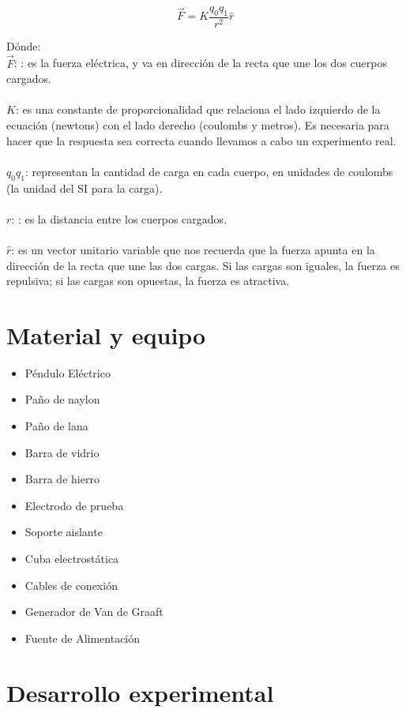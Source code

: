\documentclass[11pt]{article}
\begin{document}
\begin{multicols}{2}
$$\vec F=K \frac{q_0 q_1}{r^2}\hat r$$

Dónde:\\

$\vec F$: : es la fuerza eléctrica, y va en dirección de la recta que une los dos cuerpos cargados.\\\\
$K$: es una constante de proporcionalidad que relaciona el lado izquierdo de la ecuación (newtons) con el lado derecho (coulombs y metros). Es necesaria para hacer que la respuesta sea correcta cuando llevamos a cabo un experimento real.\\\\
$q_0 q_1$: representan la cantidad de carga en cada cuerpo, en unidades de coulombs (la unidad del SI para la carga).\\\\
$r$: : es la distancia entre los cuerpos cargados.\\\\
$\hat r$: es un vector unitario variable que nos recuerda que la fuerza apunta en la dirección de la recta que une las dos cargas. Si las cargas son iguales, la fuerza es repulsiva; si las cargas son opuestas, la fuerza es atractiva.

\section{Material y equipo}

\begin{itemize}

	\item Péndulo Eléctrico 
	\item Paño de naylon 
	\item Paño de lana 
	\item Barra de vidrio 
	\item Barra de hierro 
	\item Electrodo de prueba 
	\item Soporte aislante 
	\item Cuba electrostática 
	\item Cables de conexión 
	\item Generador de Van de Graaft 
	\item Fuente de Alimentación 
\end{itemize}

\section{Desarrollo experimental}


\end{multicols}
\end{document}

